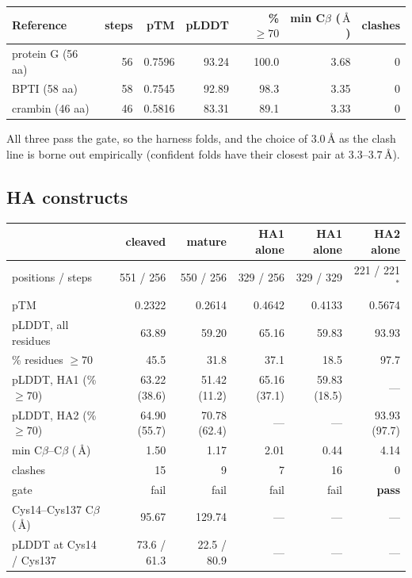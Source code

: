 \documentclass[11pt,a4paper]{article}
\newcommand{\ang}{\,\mbox{\AA}}
\begin{document}
\begin{center}
\begin{tabular}{@{}lrrrrrr@{}}
\toprule
Reference & steps & pTM & pLDDT & \% $\ge 70$ & min C$\beta$ ($\ang$) & clashes \\
\midrule
protein G (56 aa) & 56 & 0.7596 & 93.24 & 100.0 & 3.68 & 0 \\
BPTI (58 aa)      & 58 & 0.7545 & 92.89 &  98.3 & 3.35 & 0 \\
crambin (46 aa)   & 46 & 0.5816 & 83.31 &  89.1 & 3.33 & 0 \\
\bottomrule
\end{tabular}
\end{center}

All three pass the gate, so the harness folds, and the choice of $3.0\ang$
as the clash line is borne out empirically (confident folds have their
closest pair at $3.3$--$3.7\ang$).

\subsection{HA constructs}

\begin{center}
\small
\setlength{\tabcolsep}{4pt}
\begin{tabular}{@{}lrrrrr@{}}
\toprule
 & cleaved & mature & HA1 alone & HA1 alone & HA2 alone \\
\midrule
positions / steps & 551 / 256 & 550 / 256 & 329 / 256 & 329 / 329 & 221 / 221$^{*}$ \\
pTM & 0.2322 & 0.2614 & 0.4642 & 0.4133 & 0.5674 \\
pLDDT, all residues & 63.89 & 59.20 & 65.16 & 59.83 & 93.93 \\
\% residues $\ge 70$ & 45.5 & 31.8 & 37.1 & 18.5 & 97.7 \\
pLDDT, HA1 (\% $\ge 70$) & 63.22 (38.6) & 51.42 (11.2) & 65.16 (37.1) & 59.83 (18.5) & --- \\
pLDDT, HA2 (\% $\ge 70$) & 64.90 (55.7) & 70.78 (62.4) & --- & --- & 93.93 (97.7) \\
min C$\beta$--C$\beta$ ($\ang$) & 1.50 & 1.17 & 2.01 & 0.44 & 4.14 \\
clashes & 15 & 9 & 7 & 16 & 0 \\
gate & fail & fail & fail & fail & \textbf{pass} \\
Cys14--Cys137 C$\beta$ ($\ang$) & 95.67 & 129.74 & --- & --- & --- \\
pLDDT at Cys14 / Cys137 & 73.6 / 61.3 & 22.5 / 80.9 & --- & --- & --- \\
\bottomrule
\end{tabular}
\end{center}
\end{document}
